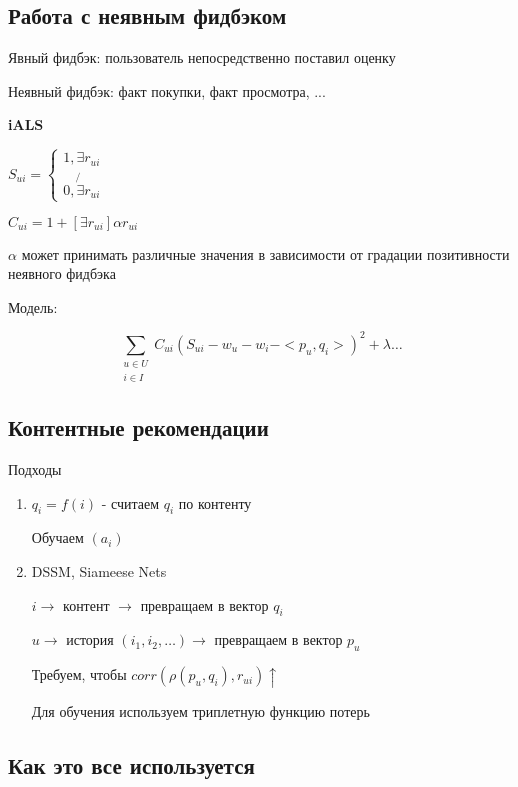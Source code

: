 \documentclass[a4paper, 12pt]{article}
\begin{document}
\subsection{Работа с неявным фидбэком}

Явный фидбэк: пользователь непосредственно поставил оценку

Неявный фидбэк: факт покупки, факт просмотра, ...

\textbf{iALS}

$S_{ui} = \begin{cases}
    1, \exists r_{ui} \\
    0, \not{\exists} r_{ui}
\end{cases}$

$C_{ui} = 1 + [\exists r_{ui}] \alpha r_{ui}$

$\alpha$ может принимать различные значения в зависимости 
от градации позитивности неявного фидбэка

Модель:

\[\sum_{\substack{u \in U \\ i \in I}} C_{ui}(S_{ui} - 
w_u - w_i - <p_u, q_i>)^2 + \lambda \dots\]

\subsection{Контентные рекомендации}

Подходы

\begin{enumerate}
    \item
    $q_i = f(i)$ - считаем $q_i$ по контенту

    Обучаем $(a_i)$
     
    \item DSSM, Siameese Nets
    
    $i \rightarrow$ контент $\rightarrow$ превращаем в вектор
    $q_i$

    $u \rightarrow$ история $(i_1, i_2, \dots) \rightarrow$
    превращаем в вектор $p_u$

    Требуем, чтобы $corr(\rho(p_u, q_i), r_{ui}) \uparrow$

    Для обучения используем триплетную функцию потерь
\end{enumerate}

\subsection{Как это все используется}
\end{document}
